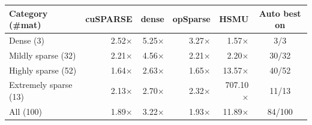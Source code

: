 \begin{tabular}{l|rrrr|c}
\toprule
Category (\#mat) & cuSPARSE & dense & opSparse & HSMU & Auto best on \\
\midrule
Dense (3) & 2.52$\times$ & 5.25$\times$ & 3.27$\times$ & 1.57$\times$ & 3/3 \\
Mildly sparse (32) & 2.21$\times$ & 4.56$\times$ & 2.21$\times$ & 2.20$\times$ & 30/32 \\
Highly sparse (52) & 1.64$\times$ & 2.63$\times$ & 1.65$\times$ & 13.57$\times$ & 40/52 \\
Extremely sparse (13) & 2.13$\times$ & 2.70$\times$ & 2.32$\times$ & 707.10$\times$ & 11/13 \\
\midrule
All (100) & 1.89$\times$ & 3.22$\times$ & 1.93$\times$ & 11.89$\times$ & 84/100 \\
\bottomrule
\end{tabular}
